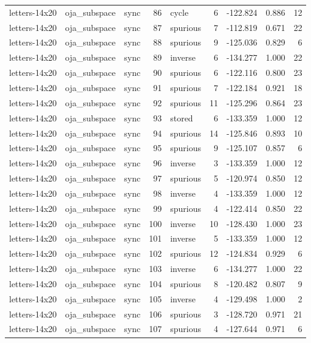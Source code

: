 \begin{tabular}{lllrlrrrr}
letters-14x20 & oja\_subspace & sync & 86 & cycle & 6 & -122.824 & 0.886 & 12 \\
letters-14x20 & oja\_subspace & sync & 87 & spurious & 7 & -112.819 & 0.671 & 22 \\
letters-14x20 & oja\_subspace & sync & 88 & spurious & 9 & -125.036 & 0.829 & 6 \\
letters-14x20 & oja\_subspace & sync & 89 & inverse & 6 & -134.277 & 1.000 & 22 \\
letters-14x20 & oja\_subspace & sync & 90 & spurious & 6 & -122.116 & 0.800 & 23 \\
letters-14x20 & oja\_subspace & sync & 91 & spurious & 7 & -122.184 & 0.921 & 18 \\
letters-14x20 & oja\_subspace & sync & 92 & spurious & 11 & -125.296 & 0.864 & 23 \\
letters-14x20 & oja\_subspace & sync & 93 & stored & 6 & -133.359 & 1.000 & 12 \\
letters-14x20 & oja\_subspace & sync & 94 & spurious & 14 & -125.846 & 0.893 & 10 \\
letters-14x20 & oja\_subspace & sync & 95 & spurious & 9 & -125.107 & 0.857 & 6 \\
letters-14x20 & oja\_subspace & sync & 96 & inverse & 3 & -133.359 & 1.000 & 12 \\
letters-14x20 & oja\_subspace & sync & 97 & spurious & 5 & -120.974 & 0.850 & 12 \\
letters-14x20 & oja\_subspace & sync & 98 & inverse & 4 & -133.359 & 1.000 & 12 \\
letters-14x20 & oja\_subspace & sync & 99 & spurious & 4 & -122.414 & 0.850 & 22 \\
letters-14x20 & oja\_subspace & sync & 100 & inverse & 10 & -128.430 & 1.000 & 23 \\
letters-14x20 & oja\_subspace & sync & 101 & inverse & 5 & -133.359 & 1.000 & 12 \\
letters-14x20 & oja\_subspace & sync & 102 & spurious & 12 & -124.834 & 0.929 & 6 \\
letters-14x20 & oja\_subspace & sync & 103 & inverse & 6 & -134.277 & 1.000 & 22 \\
letters-14x20 & oja\_subspace & sync & 104 & spurious & 8 & -120.482 & 0.807 & 9 \\
letters-14x20 & oja\_subspace & sync & 105 & inverse & 4 & -129.498 & 1.000 & 2 \\
letters-14x20 & oja\_subspace & sync & 106 & spurious & 3 & -128.720 & 0.971 & 21 \\
letters-14x20 & oja\_subspace & sync & 107 & spurious & 4 & -127.644 & 0.971 & 6 \\

\end{tabular}
